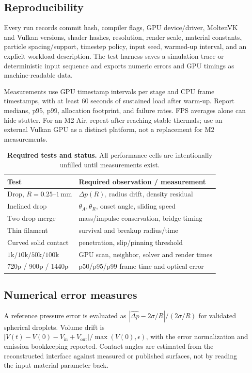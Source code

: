 \documentclass[10pt,a4paper]{article}
\makeatletter
\renewcommand{\section}{\@startsection{section}{1}{\z@}{1.35ex plus .5ex minus .1ex}{.7ex}{\normalfont\bfseries\normalsize}}
\newcommand{\mm}{\,\mathrm{mm}}
\makeatother
\begin{document}
\section{Evaluation Protocol}
\subsection{Reproducibility}
Every run records commit hash, compiler flags, GPU device/driver, MoltenVK and Vulkan versions, shader hashes, resolution, render scale, material constants, particle spacing/support, timestep policy, input seed, warmed-up interval, and an explicit workload description. The test harness saves a simulation trace or deterministic input sequence and exports numeric errors and GPU timings as machine-readable data.

Measurements use GPU timestamp intervals per stage and CPU frame timestamps, with at least 60 seconds of sustained load after warm-up. Report medians, p95, p99, allocation footprint, and failure rates. FPS averages alone can hide stutter. For an M2 Air, repeat after reaching stable thermals; use an external Vulkan GPU as a distinct platform, not a replacement for M2 measurements.

\begin{table}[t]
\centering\footnotesize
\caption{\textbf{Required tests and status.} All performance cells are intentionally unfilled until measurements exist.}
\label{tab:tests}
\begin{tabularx}{\columnwidth}{@{}p{}X@{}}
\toprule
Test & Required observation / measurement\\
\midrule
Drop, $R=0.25$--$1\mm$ & $\Delta p(R)$, radius drift, density residual \\
Inclined drop & $\theta_A,\theta_R$, onset angle, sliding speed\\
Two-drop merge & mass/impulse conservation, bridge timing\\
Thin filament & survival and breakup radius/time\\
Curved solid contact & penetration, slip/pinning threshold\\
$1$k/$10$k/$50$k/$100$k & GPU scan, neighbor, solver and render times\\
720p / 900p / 1440p & p50/p95/p99 frame time and optical error\\
\bottomrule
\end{tabularx}
\end{table}

\subsection{Numerical error measures}
A reference pressure error is evaluated as $|\widehat{\Delta p}-2\sigma/R|/(2\sigma/R)$ for validated spherical droplets. Volume drift is $|V(t)-V(0)-V_{\mathrm{in}}+V_{\mathrm{out}}|/\max(V(0),\epsilon)$, with the error normalization and emission bookkeeping reported. Contact angles are estimated from the reconstructed interface against measured or published surfaces, not by reading the input material parameter back.
\end{document}
